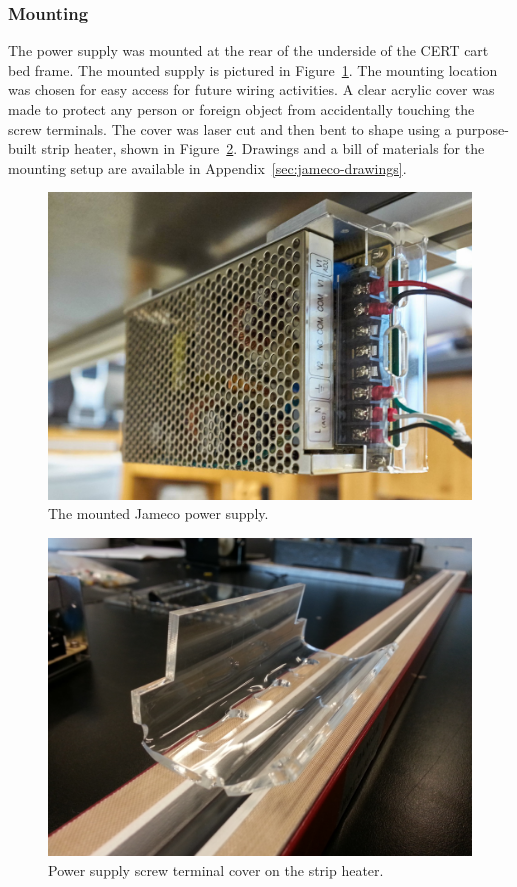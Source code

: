 \subsubsection{Mounting}
The power supply was mounted at the rear of the underside of the CERT cart bed frame. The mounted supply is pictured in Figure~\ref{fig:jameco-mounted}. The mounting location was chosen for easy access for future wiring activities. A clear acrylic cover was made to protect any person or foreign object from accidentally touching the screw terminals. The cover was laser cut and then bent to shape using a purpose-built strip heater, shown in Figure~\ref{fig:strip-heat}. Drawings and a bill of materials for the mounting setup are available in Appendix~\ref{sec:jameco-drawings}.

\begin{figure}
    \centering
    \includegraphics[width=.8\linewidth]{figures/jameco-mounted}
    \caption{The mounted Jameco power supply.}
    \label{fig:jameco-mounted}
\end{figure}

\begin{figure}
    \centering
    \includegraphics[width=.8\linewidth]{figures/strip-heat}
    \caption{Power supply screw terminal cover on the strip heater.}
    \label{fig:strip-heat}
\end{figure}
